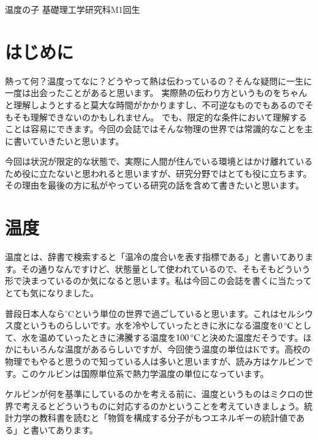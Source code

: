 \documentclass[10pt,b5paper,papersize,dvipdfmx]{jsbook}
\begin{document}

\newcommand\degreeCelsius{{}^\circ\mathrm{C}} %


\kaishititle%
  {温度の子}%
  {基礎理工学研究科M1回生}%
  {}%


\section*{はじめに}
熱って何？温度ってなに？どうやって熱は伝わっているの？そんな疑問に一生に一度は出会ったことがあると思います。
実際熱の伝わり方というものをちゃんと理解しようとすると莫大な時間がかかりますし、不可逆なものでもあるのでそもそも理解できないのかもしれません。
でも、限定的な条件において理解することは容易にできます。今回の会誌ではそんな物理の世界では常識的なことを主に書いていきたいと思います。\par
今回は状況が限定的な状態で、実際に人間が住んでいる環境とはかけ離れているため役に立たないと思われると思いますが、研究分野ではとても役に立ちます。
その理由を最後の方に私がやっている研究の話を含めて書きたいと思います。


%
\section{温度}
温度とは、辞書で検索すると「温冷の度合いを表す指標である」と書いてあります。その通りなんですけど、状態量として使われているので、そもそもどういう形で決まっているのか気になると思います。私は今回この会誌を書くに当たってとても気になりました。\par 
普段日本人なら$\degreeCelsius$という単位の世界で過ごしていると思います。これはセルシウス度というものらしいです。水を冷やしていったときに氷になる温度を$0\tani{\degreeCelsius}$として、水を温めていったときに沸騰する温度を$100\tani{\degreeCelsius}$と決めた温度だそうです。ほかにもいろんな温度があるらしいですが、今回使う温度の単位は$\mathrm{K}$です。高校の物理でもやると思うので知っている人は多いと思いますが、読み方はケルビンです。このケルビンは国際単位系で熱力学温度の単位になっています。\par

ケルビンが何を基準にしているのかを考える前に、温度というものはミクロの世界で考えるとどういうものに対応するのかということを考えていきましょう。統計力学の教科書を読むと「物質を構成する分子がもつエネルギーの統計値である」と書いてあります。\par
\end{document}
